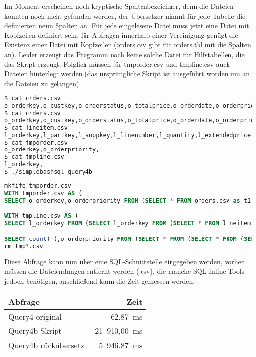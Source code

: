 Im Moment erscheinen noch kryptische Spaltenbezeichner, denn die Dateien konnten noch nicht gefunden werden, der Übersetzer nimmt für jede Tabelle die definierten neun Spalten an. Für jede eingelesene Datei muss jetzt eine Datei mit Kopfzeilen definiert sein, für Abfragen innerhalb einer Vereinigung genügt die Existenz einer Datei mit Kopfzeilen (orders.csv gibt für orders.tbl mit die Spalten an). Leider erzeugt das Programm noch keine solche Datei für Hilfstabellen, die das Skript erzeugt. Folglich müssen für tmporder.csv und tmpline.csv auch Dateien hinterlegt werden (das ursprüngliche Skript ist ausgeführt worden um an die Dateien zu gelangen).
\begin{lstlisting}[language=Bash]
$ cat orders.csv 
o_orderkey,o_custkey,o_orderstatus,o_totalprice,o_orderdate,o_orderpriority,o_clerk,o_shippriority,o_comment,
$ cat orders.csv 
o_orderkey,o_custkey,o_orderstatus,o_totalprice,o_orderdate,o_orderpriority,o_clerk,o_shippriority,o_comment,
$ cat lineitem.csv 
l_orderkey,l_partkey,l_suppkey,l_linenumber,l_quantity,l_extendedprice,l_discount,l_tax,l_returnflag,l_linestatus,l_shipdate,l_commitdate,l_receiptdate,l_shipinstruct,l_shipmode,l_comment,
$ cat tmporder.csv 
o_orderkey,o_orderpriority,
$ cat tmpline.csv 
l_orderkey,
$ ./simplebashsql query4b
\end{lstlisting}\begin{lstlisting}[language=SQL]
mkfifo tmporder.csv
WITH tmporder.csv AS (
SELECT o_orderkey,o_orderpriority FROM (SELECT * FROM orders.csv as t1  UNION SELECT * FROM (SELECT * FROM orders.tbl as t1  ORDER BY $1,$1) as t1union1 ) as t1  WHERE (true) AND (o_orderdate<'1993-10-01') AND (o_orderdate>='1993-07-01')  )

WITH tmpline.csv AS (
SELECT l_orderkey FROM (SELECT l_orderkey FROM (SELECT * FROM lineitem.csv as t1  UNION SELECT * FROM (SELECT * FROM lineitem.tbl as t1  ORDER BY $1,$1) as t1union1 ) as t1  WHERE (true) AND (l_commitdate<l_receiptdate) ) as t1  GROUP BY l_orderkey )

SELECT count(*),o_orderpriority FROM (SELECT * FROM (SELECT * FROM (SELECT o_orderpriority FROM (SELECT o_orderkey,o_orderpriority FROM tmporder.csv as t1, tmpline.csv as t2  WHERE (t1.o_orderkey=t2.l_orderkey) ) as t1 ) as t1 ) as t1 ) as t1  GROUP BY o_orderpriority
rm tmp*.csv
\end{lstlisting}

Diese Abfrage kann nun über eine SQL-Schnittstelle eingegeben werden, vorher müssen die Dateiendungen entfernt werden (.csv), die manche SQL-Inline-Tools jedoch benötigen, anschließend kann die Zeit gemessen werden.%

\begin{center}
\begin{tabular}{|l|r|}
Abfrage & Zeit \\ \hline
Query4 original & 62.87\ ms\\
Query4b Skript &  21\ 910,00\ ms\\
Query4b rückübersetzt & 5\ 946.87\ ms
\end{tabular}
\end{center}
